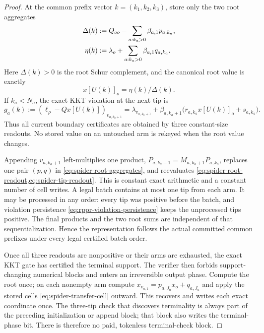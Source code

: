 \begin{proof}
At the common prefix vector $k=(k_1,k_2,k_3)$, store only the two root
aggregates
\begin{align}
 \Delta(k)
 &:=Q_{oo}-\sum_{a:k_a>0}\beta_{a,1}p_{a,k_a},\notag\\
 \eta(k)
 &:=\lambda_o+\sum_{a:k_a>0}\beta_{a,1}q_{a,k_a}.
 \label{eq:spider-root-aggregates}
\end{align}
Here $\Delta(k)>0$ is the root Schur complement, and the canonical root value
is exactly
\begin{equation}
 x[U(k)]_o=\eta(k)/\Delta(k).
 \label{eq:spider-root-readout}
\end{equation}
If $k_a<N_a$, the exact KKT violation at the next tip is
\begin{equation}
 g_a(k)
 :=(\ell_\rho-Qx[U(k)])_{v_{a,k_a+1}}
 =\lambda_{v_{a,k_a+1}}
  +\beta_{a,k_a+1}
    \bigl(r_{a,k_a}x[U(k)]_o+s_{a,k_a}\bigr).
 \label{eq:spider-tip-readout}
\end{equation}
Thus all current boundary certificates are obtained by three constant-size
readouts.  No stored value on an untouched arm is rekeyed when the root value
changes.

Appending $v_{a,k_a+1}$ left-multiplies one product,
$P_{a,k_a+1}=M_{a,k_a+1}P_{a,k_a}$, replaces one pair $(p,q)$ in
\cref{eq:spider-root-aggregates}, and reevaluates
\cref{eq:spider-root-readout,eq:spider-tip-readout}.  This is constant exact
arithmetic and a constant number of cell writes.  A legal batch contains at
most one tip from each arm.  It may be processed in any order: every tip was
positive before the batch, and violation persistence
\eqref{eq:rppr-violation-persistence} keeps the unprocessed tips positive.
The final products and the two root sums are independent of that
sequentialization.  Hence the representation follows the actual committed
common prefixes under every legal certified batch order.

Once all three readouts are nonpositive or their arms are exhausted, the
exact KKT gate has certified the terminal support.  The verifier then forbids
support-changing numerical blocks and enters an irreversible output phase.
Compute the root once; on each nonempty arm compute
$x_{v_{a,1}}=p_{a,J_a}x_o+q_{a,J_a}$ and apply the stored cells
\cref{eq:spider-transfer-cell} outward.  This recovers and writes each exact
coordinate once.  The three-tip check that discovers terminality is always
part of the preceding initialization or append block; that block also writes
the terminal-phase bit.  There is therefore no paid, tokenless terminal-check
block.


\end{proof}
